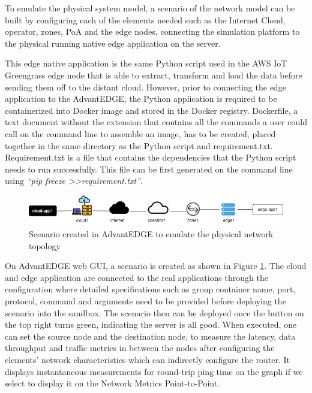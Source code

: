 To emulate the physical system model, a scenario of the network model can be built by configuring each of the elements needed such as the Internet Cloud, operator, zones, PoA and the edge nodes,  connecting the simulation platform to the physical running native edge application on the server. 

This edge native application is the same Python script used in the AWS IoT Greengrass edge node that is able to extract, transform and load the data before sending them off to the distant cloud. However, prior to connecting the edge application to the AdvantEDGE, the Python application is required to be containerized into Docker image and stored in the Docker registry. Dockerfile, a text document without the extension that contains all the commands a user could call on the command line to assemble an image, has to be created, placed together in the same directory as the Python script and requirement.txt. Requirement.txt is a file that contains the dependencies that the Python script needs to run successfully. This file can be first generated on the command line using \textit{“pip freeze \textgreater\textgreater requirement.txt”}. 

\begin{figure}[ht]
    \centering
    \includegraphics[width=1\linewidth]{pages/Chapter4/Chapter 4 Images/Scenario.png}
    \caption{Scenario created in AdvantEDGE to emulate the physical network topology}
    \label{fig:AdvantEDGE_scenario}
\end{figure}

On AdvantEDGE web GUI, a scenario is created as shown in Figure \ref{fig:AdvantEDGE_scenario}.
The cloud and edge application are connected to the real applications through the configuration where detailed specifications such as group container name, port, protocol, command and arguments need to be provided before deploying the scenario into the sandbox. The scenario then can be deployed once the button on the top right turns green, indicating the server is all good. When executed, one can set the source node and the destination node, to measure the latency, data throughput and traffic metrics in between the nodes after configuring the elements’ network characteristics which can indirectly configure the router. It displays instantaneous measurements for round-trip ping time on the graph if we select to display it on the Network Metrics Point-to-Point.


